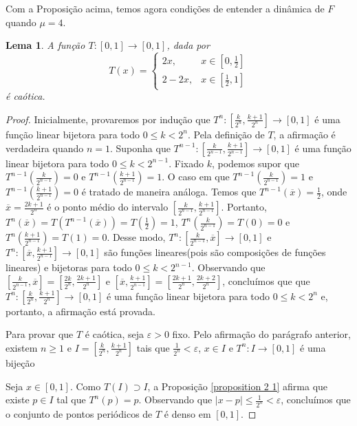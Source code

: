 \documentclass[a4paper, 12pt]{article}
\theoremstyle{definition}
\theoremstyle{plain}
\theoremstyle{plain}
\newtheorem{lemma}[definition]{Lema}
\theoremstyle{plain}
\theoremstyle{remark}
\begin{document}
Com a Proposição acima, temos agora condições de entender a dinâmica de $F$ quando $\mu = 4$.

\begin{lemma}
\label{lemma 5 1}
A função $T: [0,1] \rightarrow [0,1]$, dada por
\[
T(x) = 
  \begin{cases}
      2x, & x \in [0, \frac{1}{2}] \\
      2 - 2x, & x \in [\frac{1}{2}, 1] 
  \end{cases}
\]
é caótica.
\end{lemma}

\begin{proof}
Inicialmente, provaremos por indução que $T^n: [\frac{k}{2^n}, \frac{k+1}{2^n}] \rightarrow [0,1]$ é uma função linear bijetora para todo $0 \leq k  < 2^n$. Pela definição de $T$, a afirmação é verdadeira quando $n = 1$. Suponha que $T^{n-1}: [\frac{k}{2^{n-1}}, \frac{k+1}{2^{n-1}}] \rightarrow [0,1]$ é uma função linear bijetora para todo $0 \leq k < 2^{n-1}$. Fixado $k$, podemos supor que $T^{n-1}(\frac{k}{2^{n-1}}) = 0$ e $T^{n-1}(\frac{k+1}{2^{n-1}}) = 1$. O caso em que $T^{n-1}(\frac{k}{2^{n-1}}) = 1$ e $T^{n-1}(\frac{k+1}{2^{n-1}}) = 0$ é tratado de maneira análoga. Temos que $T^{n-1}(\overline{x}) = \frac{1}{2}$, onde $\overline{x} = \frac{2k+1}{2^n}$ é o ponto médio do intervalo $[\frac{k}{2^{n-1}}, \frac{k+1}{2^{n-1}}]$. Portanto, $T^n(\overline{x}) = T(T^{n-1}(\overline{x})) = T(\frac{1}{2}) = 1$, $T^n(\frac{k}{2^{n-1}}) = T(0) = 0$ e $T^n(\frac{k+1}{2^{n-1}}) = T(1) = 0$. Desse modo, $T^n: [\frac{k}{2^{n-1}}, \overline{x}] \rightarrow [0,1]$ e $T^n: [\overline{x}, \frac{k+1}{2^{n-1}}] \rightarrow [0,1]$ são funções lineares(pois são composições de funções lineares) e bijetoras para todo $0 \leq k < 2^{n-1}$. Observando que $[\frac{k}{2^{n-1}}, \overline{x}] =  [\frac{2k}{2^n}, \frac{2k+1}{2^n}]$ e $[\overline{x}, \frac{k+1}{2^{n-1}}] =  [\frac{2k+1}{2^n}, \frac{2k+2}{2^n}]$, concluímos que  que $T^n: [\frac{k}{2^n}, \frac{k+1}{2^n}] \rightarrow [0,1]$ é uma função linear bijetora para todo $0 \leq k  < 2^n$ e, portanto, a afirmação está provada.

Para provar que $T$ é caótica, seja $\varepsilon > 0$ fixo. Pelo afirmação do parágrafo anterior, existem $n \geq 1$ e $I = [\frac{k}{2^n}, \frac{k+1}{2^n}]$  tais que $\frac{1}{2^n} < \varepsilon$, $x \in I$ e $T^n: I \rightarrow [0,1]$ é uma bijeção

Seja $x \in [0,1]$. Como $T(I) \supset I$, a Proposição \ref{proposition 2 1} afirma que existe $p \in I$ tal que $T^n(p) = p$. Observando que $|x-p| \leq \frac{1}{2^n} < \varepsilon$, concluímos que o conjunto de pontos periódicos de $T$ é denso em $[0,1]$.


\end{proof}
\end{document}
